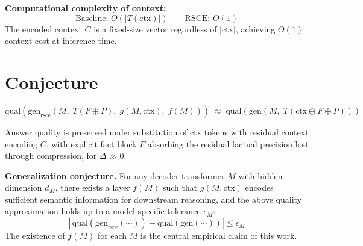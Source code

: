 \documentclass[11pt]{article}
\newcommand{\gen}{\mathrm{gen}}
\newcommand{\geni}{\mathrm{gen}_{\mathrm{rsce}}}
\newcommand{\qual}{\mathrm{qual}}
\newcommand{\ctx}{\mathrm{ctx}}
\begin{document}
\medskip
\textbf{Computational complexity of context:}
\[
    \text{Baseline: } O(|T(\ctx)|) \qquad \text{RSCE: } O(1)
\]
The encoded context $C$ is a fixed-size vector regardless of $|\ctx|$,
achieving $O(1)$ context cost at inference time.

\section*{Conjecture}

\[
    \qual\!\left(\geni\!\left(M,\; T(F \oplus P),\; g(M, \ctx),\; f(M)\right)\right)
    \;\approx\;
    \qual\!\left(\gen\!\left(M,\; T(\ctx \oplus F \oplus P)\right)\right)
\]

Answer quality is preserved under substitution of $\ctx$ tokens with
residual context encoding $C$, with explicit fact block $F$ absorbing
the residual factual precision lost through compression, for $\Delta \gg 0$.

\medskip
\textbf{Generalization conjecture.} For any decoder transformer $M$ with
hidden dimension $d_M$, there exists a layer $f(M)$ such that $g(M, \ctx)$
encodes sufficient semantic information for downstream reasoning, and the
above quality approximation holds up to a model-specific tolerance
$\epsilon_M$:
\[
    \left|\, \qual\!\left(\geni(\cdots)\right) - \qual\!\left(\gen(\cdots)\right) \right| \leq \epsilon_M
\]
The existence of $f(M)$ for each $M$ is the central empirical claim of
this work.
\end{document}
